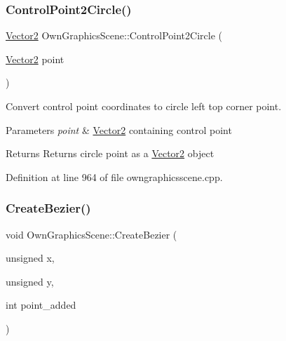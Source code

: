 \mbox{\label{classOwnGraphicsScene_abc2de254d3e34b716eb36e33e0486f33}} 
\subsubsection{\texorpdfstring{Control\+Point2\+Circle()}{ControlPoint2Circle()}}
{\footnotesize\ttfamily \mbox{\hyperlink{classVector2}{Vector2}} Own\+Graphics\+Scene\+::\+Control\+Point2\+Circle (\begin{DoxyParamCaption}\item[{\mbox{\hyperlink{classVector2}{Vector2}}}]{point }\end{DoxyParamCaption})}



Convert control point coordinates to circle left top corner point. 


\begin{DoxyParams}{Parameters}
{\em point} & \mbox{\hyperlink{classVector2}{Vector2}} containing control point \\
\hline
\end{DoxyParams}
\begin{DoxyReturn}{Returns}
Returns circle point as a \mbox{\hyperlink{classVector2}{Vector2}} object 
\end{DoxyReturn}


Definition at line 964 of file owngraphicsscene.\+cpp.

\mbox{\label{classOwnGraphicsScene_a9c03d25db8eef3116adbaeba1fc9c4dc}} 
\subsubsection{\texorpdfstring{Create\+Bezier()}{CreateBezier()}}
{\footnotesize\ttfamily void Own\+Graphics\+Scene\+::\+Create\+Bezier (\begin{DoxyParamCaption}\item[{unsigned}]{x,  }\item[{unsigned}]{y,  }\item[{int}]{point\+\_\+added }\end{DoxyParamCaption})}



